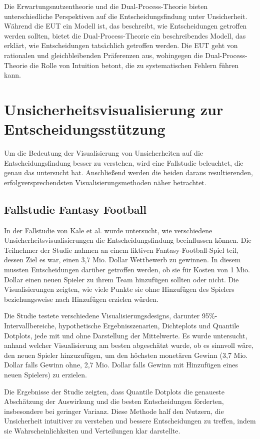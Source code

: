 Die Erwartungsnutzentheorie und die Dual-Process-Theorie bieten unterschiedliche Perspektiven auf die Entscheidungsfindung unter Unsicherheit. Während die EUT ein Modell ist, das beschreibt, wie Entscheidungen getroffen werden sollten, bietet die Dual-Process-Theorie ein beschreibendes Modell, das erklärt, wie Entscheidungen tatsächlich getroffen werden. Die EUT geht von rationalen und gleichbleibenden Präferenzen aus, wohingegen die Dual-Process-Theorie die Rolle von Intuition betont, die zu systematischen Fehlern führen kann.

\section{Unsicherheitsvisualisierung zur Entscheidungsstützung}

Um die Bedeutung der Visualisierung von Unsicherheiten auf die Entscheidungsfindung besser zu verstehen, wird eine Fallstudie beleuchtet, die genau das untersucht hat. Anschließend werden die beiden daraus resultierenden, erfolgversprechendsten Visualisierungsmethoden näher betrachtet.

\subsection{Fallstudie Fantasy Football}

In der Fallstudie von Kale et al. \cite{Kale2021} wurde untersucht, wie verschiedene Unsicherheitsvisualisierungen die Entscheidungsfindung beeinflussen können. Die Teilnehmer der Studie nahmen an einem fiktiven Fantasy-Football-Spiel teil, dessen Ziel es war, einen 3,7 Mio. Dollar Wettbewerb zu gewinnen. In diesem mussten Entscheidungen darüber getroffen werden, ob sie für Kosten von 1 Mio. Dollar einen neuen Spieler zu ihrem Team hinzufügen sollten oder nicht. Die Visualisierungen zeigten, wie viele Punkte sie ohne Hinzufügen des Spielers beziehungsweise nach Hinzufügen erzielen würden. 

Die Studie testete verschiedene Visualisierungsdesigns, darunter 95\%-Intervallbereiche, hypothetische Ergebnisszenarien, Dichteplots und Quantile Dotplots, jede mit und ohne Darstellung der Mittelwerte. Es wurde untersucht, anhand welcher Visualisierung am besten abgeschätzt wurde, ob es sinnvoll wäre, den neuen Spieler hinzuzufügen, um den höchsten monetären Gewinn (3,7 Mio. Dollar falls Gewinn ohne, 2,7 Mio. Dollar falls Gewinn mit Hinzufügen eines neuen Spielers) zu erzielen.

Die Ergebnisse der Studie zeigten, dass Quantile Dotplots die genaueste Abschätzung der Auswirkung und die besten Entscheidungen förderten, insbesondere bei geringer Varianz. Diese Methode half den Nutzern, die Unsicherheit intuitiver zu verstehen und bessere Entscheidungen zu treffen, indem sie Wahrscheinlichkeiten und Verteilungen klar darstellte.

